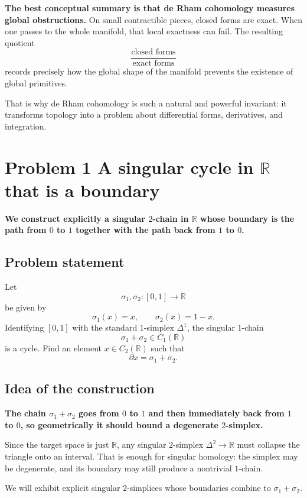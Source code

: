\documentclass[12pt,a4paper]{article}
\theoremstyle{notespace}
\begin{document}
\textbf{The best conceptual summary is that de Rham cohomology measures global obstructions.} On small contractible pieces, closed forms are exact. When one passes to the whole manifold, that local exactness can fail. The resulting quotient
\[
\frac{\text{closed forms}}{\text{exact forms}}
\]
records precisely how the global shape of the manifold prevents the existence of global primitives.

That is why de Rham cohomology is such a natural and powerful invariant: it transforms topology into a problem about differential forms, derivatives, and integration.

\section{Problem 1 A singular cycle in \(\mathbb{R}\) that is a boundary}

\textbf{We construct explicitly a singular \(2\)-chain in \(\mathbb{R}\) whose boundary is the path from \(0\) to \(1\) together with the path back from \(1\) to \(0\).}

\subsection{Problem statement}

Let
\[
\sigma_1,\sigma_2:[0,1]\to \mathbb{R}
\]
be given by
\[
\sigma_1(x)=x,
\qquad
\sigma_2(x)=1-x.
\]
Identifying \([0,1]\) with the standard \(1\)-simplex \(\Delta^1\), the singular \(1\)-chain
\[
\sigma_1+\sigma_2\in C_1(\mathbb{R})
\]
is a cycle. Find an element \(x\in C_2(\mathbb{R})\) such that
\[
\partial x=\sigma_1+\sigma_2.
\]

\subsection{Idea of the construction}

\textbf{The chain \(\sigma_1+\sigma_2\) goes from \(0\) to \(1\) and then immediately back from \(1\) to \(0\), so geometrically it should bound a degenerate \(2\)-simplex.}

Since the target space is just \(\mathbb{R}\), any singular \(2\)-simplex \(\Delta^2\to \mathbb{R}\) must collapse the triangle onto an interval. That is enough for singular homology: the simplex may be degenerate, and its boundary may still produce a nontrivial \(1\)-chain.

We will exhibit explicit singular \(2\)-simplices whose boundaries combine to \(\sigma_1+\sigma_2\).
\end{document}
